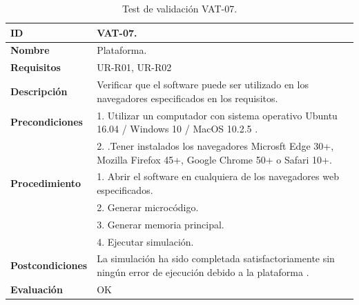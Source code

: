 \begin{center}
\begin{table}[htb]
\centering
\caption{Test de validación VAT-07.}
\begin{tabular}{@{}p{2.5cm} p{9cm}@{}} 
\toprule
\textbf{ID} 					& VAT-07. \\
\midrule
\textbf{Nombre} 				& Plataforma. \\
\midrule
\textbf{Requisitos} 		& UR-R01, UR-R02\\
\midrule
\textbf{Descripción} 		& Verificar que el software puede ser utilizado en los navegadores especificados en los requisitos. \\
\midrule
\textbf{Precondiciones}		& 1. Utilizar un computador con sistema operativo Ubuntu 16.04 / Windows 10 / MacOS 10.2.5 .\\
							& 2. .Tener instalados los navegadores Microsft Edge 30+, Mozilla Firefox 45+, Google Chrome 50+ o Safari 10+. \\
\midrule
\textbf{Procedimiento}			& 1. Abrir el software en cualquiera de los navegadores web especificados. \\
							& 2. Generar microcódigo.\\
							& 3. Generar memoria principal.\\
							& 4. Ejecutar simulación.\\
\midrule
\textbf{Postcondiciones} 		&  La simulación ha sido completada satisfactoriamente sin ningún error de ejecución debido a la plataforma .\\
\midrule
\textbf{Evaluación} 			& OK \\
\bottomrule
\end{tabular}
\label{tab:vat-07}
\end{table}
\end{center}

